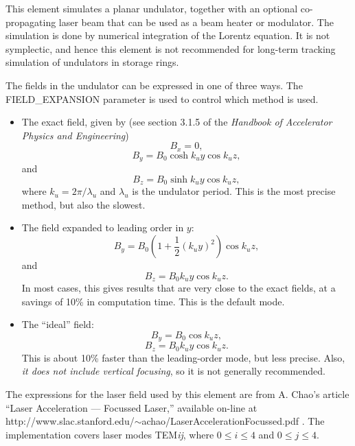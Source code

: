 This element simulates a planar undulator, together with an optional
co-propagating laser beam that can be used as a beam heater or
modulator.  The simulation is done by numerical integration of the
Lorentz equation.  It is not symplectic, and hence this element is not
recommended for long-term tracking simulation of undulators in storage
rings.  

The fields in the undulator can be expressed in one of three ways.
The FIELD\_EXPANSION parameter is used to control which method is used.
\begin{itemize}
\item The exact field, given by (see section 3.1.5 of the {\em Handbook of
Accelerator Physics and Engineering})
\begin{equation}
B_x = 0,
\end{equation}
\begin{equation}
B_y = B_0 \cosh k_u y \cos k_u z,
\end{equation}
and
\begin{equation}
B_z = B_0 \sinh k_u y \cos k_u z ,
\end{equation}
where $k_u = 2\pi/\lambda_u$ and $\lambda_u$ is the undulator period.
This is the most precise method, but also the slowest.  

\item The field expanded to leading order in $y$:
\begin{equation}
B_y = B_0 ( 1 + \frac{1}{2}(k_u y)^2 ) \cos k_u z,
\end{equation}
and
\begin{equation}
B_z = B_0 k_u y \cos k_u z.
\end{equation}
In most cases, this gives results that are very close to the exact fields,
at a savings of 10\% in computation time.
This is the default mode.

\item The ``ideal'' field:
\begin{equation}
B_y = B_0 \cos k_u z,
\end{equation}
\begin{equation}
B_z = B_0 k_u y \cos k_u z.
\end{equation}
This is about 10\% faster than the leading-order mode, but less
precise.  Also, {\em it does not include vertical focusing}, so it is
not generally recommended.
\end{itemize}

The expressions for the laser field used by this element are from
A. Chao's article ``Laser Acceleration --- Focussed Laser,'' available
on-line at \\
http://www.slac.stanford.edu/$\sim$achao/LaserAccelerationFocussed.pdf .
The implementation covers laser modes TEM{\em ij}, where
$0\leq i \leq 4$ and $0 \leq j \leq 4$.

